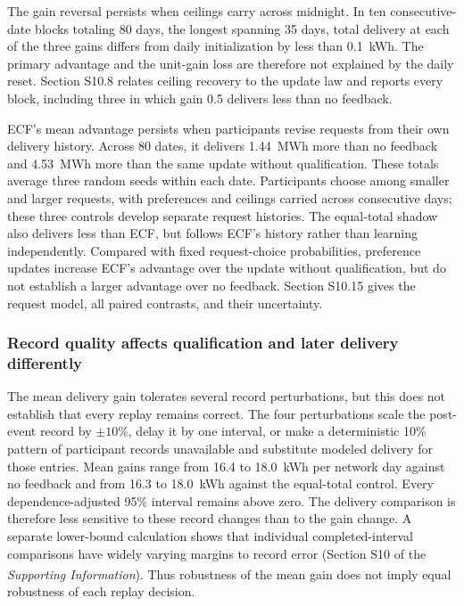 \documentclass[twoside,twocolumn,9pt]{article}
\newcommand{\suppref}{\textit{Supporting Information}\textsuperscript{\dag}}
\begin{document}
The gain reversal persists when ceilings carry across midnight. In ten
consecutive-date blocks totaling 80 days, the longest spanning 35 days,
total delivery at each of the three gains differs from daily initialization
by less than 0.1~kWh. The primary advantage and the unit-gain loss are
therefore not explained by the daily reset. Section S10.8 relates ceiling
recovery to the update law and reports every block, including three in which
gain 0.5 delivers less than no feedback.

ECF's mean advantage persists when participants revise requests from their own
delivery history. Across 80 dates, it delivers 1.44~MWh more than no feedback
and 4.53~MWh more than the same update without qualification. These totals
average three random seeds within each date. Participants choose among smaller
and larger requests, with preferences and ceilings carried across consecutive
days; these three controls develop separate request histories. The equal-total shadow
also delivers less than ECF, but follows ECF's history rather than learning
independently. Compared with fixed request-choice probabilities, preference
updates increase ECF's advantage over the update without qualification, but
do not establish a larger advantage over no feedback. Section S10.15 gives
the request model, all paired contrasts, and their uncertainty.

\subsubsection{Record quality affects qualification and later delivery differently}
\label{sec:record_results}

The mean delivery gain tolerates several record perturbations, but this does
not establish that every replay remains correct. The four perturbations
scale the post-event record by $\pm10\%$, delay it by one interval, or
make a deterministic 10\% pattern of participant records unavailable and
substitute modeled delivery for those entries. Mean gains range from
16.4 to 18.0~kWh per network day against no feedback and from 16.3 to
18.0~kWh against the equal-total control. Every dependence-adjusted 95\%
interval remains above zero. The delivery comparison is therefore less
sensitive to these record changes than to the gain change. A separate
lower-bound calculation shows that individual completed-interval comparisons
have widely varying margins to record error (Section S10 of the \suppref).
Thus robustness of the mean gain does not imply equal robustness of each
replay decision.
\end{document}
